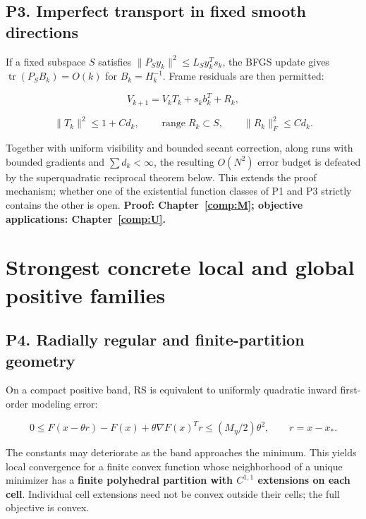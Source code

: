 \subsection{P3. Imperfect transport in fixed smooth directions}\label{p3.-imperfect-transport-in-fixed-smooth-directions}

If a fixed subspace \(S\) satisfies \(\|P_Sy_k\|^2\le L_Sy_k^Ts_k\), the BFGS update gives \(\operatorname{tr}(P_SB_k)=O(k)\) for \(B_k=H_k^{-1}\). Frame residuals are then permitted:

\[V_{k+1}=V_kT_k+s_kb_k^T+R_k,\]

\[\|T_k\|^2\le1+Cd_k,\qquad \operatorname{range}R_k\subset S,
\qquad\|R_k\|_F^2\le Cd_k.\]

Together with uniform visibility and bounded secant correction, along runs with bounded gradients and \(\sum d_k<\infty\), the resulting \(O(N^2)\) error budget is defeated by the superquadratic reciprocal theorem below. This extends the proof mechanism; whether one of the existential function classes of P1 and P3 strictly contains the other is open. \textbf{Proof: Chapter~\ref{comp:M}; objective applications: Chapter~\ref{comp:U}.}



\section{Strongest concrete local and global positive families}\label{strongest-concrete-local-and-global-positive-families}




\subsection{P4. Radially regular and finite-partition geometry}\label{p4.-radially-regular-and-finite-partition-geometry}

On a compact positive band, RS is equivalent to uniformly quadratic inward first-order modeling error:

\[
 0\le F(x-\theta r)-F(x)+\theta\nabla F(x)^Tr
 \le(M_\eta/2)\theta^2,\qquad r=x-x_*.
\]

The constants may deteriorate as the band approaches the minimum. This yields local convergence for a finite convex function whose neighborhood of a unique minimizer has a \textbf{finite polyhedral partition with \(C^{1,1}\) extensions on each cell}. Individual cell extensions need not be convex outside their cells; the full objective is convex.

